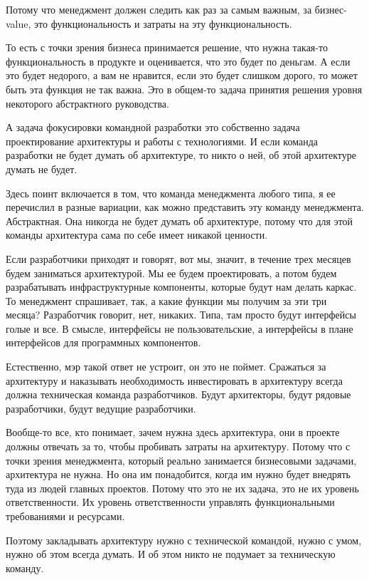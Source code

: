Потому что менеджмент должен следить как раз за самым важным, за бизнес-value, это функциональность и затраты на эту функциональность. 

То есть с точки зрения бизнеса принимается решение, что нужна такая-то функциональность в продукте и оценивается, что это будет по деньгам. А если это будет недорого, а вам не нравится, если это будет слишком дорого, то может быть эта функция не так важна. Это в общем-то задача принятия решения уровня некоторого абстрактного руководства.

А задача фокусировки командной разработки это собственно задача проектирование архитектуры и работы с технологиями. И если команда разработки не будет думать об архитектуре, то никто о ней, об этой архитектуре думать не будет. 

Здесь поинт включается в том, что команда менеджмента любого типа, я ее перечислил в разные вариации, как можно представить эту команду менеджмента. Абстрактная. Она никогда не будет думать об архитектуре, потому что для этой команды архитектура сама по себе имеет никакой ценности.

Если разработчики приходят и говорят, вот мы, значит, в течение трех месяцев будем заниматься архитектурой. Мы ее будем проектировать, а потом будем разрабатывать инфраструктурные компоненты, которые будут нам делать каркас. То менеджмент спрашивает, так, а какие функции мы получим за эти три месяца? Разработчик говорит, нет, никаких. Типа, там просто будут интерфейсы голые и все. В смысле, интерфейсы не пользовательские, а интерфейсы в плане интерфейсов для программных компонентов.

Естественно, мэр такой ответ не устроит, он это не поймет. Сражаться за архитектуру и наказывать необходимость инвестировать в архитектуру всегда должна техническая команда разработчиков. Будут архитекторы, будут рядовые разработчики, будут ведущие разработчики.

Вообще-то все, кто понимает, зачем нужна здесь архитектура, они в проекте должны отвечать за то, чтобы пробивать затраты на архитектуру. Потому что с точки зрения менеджмента, который реально занимается бизнесовыми задачами, архитектура не нужна. Но она им понадобится, когда им нужно будет внедрять туда из людей главных проектов. Потому что это не их задача, это не их уровень ответственности. Их уровень ответственности управлять функциональными требованиями и ресурсами.

Поэтому закладывать архитектуру нужно с технической командой, нужно с умом, нужно об этом всегда думать. И об этом никто не подумает за техническую команду.

